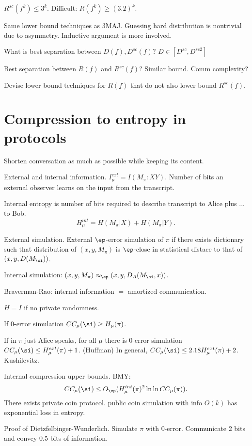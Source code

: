 $R^{sc}(f^k)\le 3^k$. Difficult: $R(f^k)\ge (3.2)^k$.

Same lower bound techniques as 3MAJ. Guessing hard distribution is nontrivial due to asymmetry. Inductive argument is more involved.

What is best separation between $D(f),D^{sc}(f)$? $D\in [D^{sc},D^{sc2}]$

Best separation between $R(f)$ and $R^{sc}(f)$? Similar bound. Comm complexity?

Devise lower bound techniques for $R(f)$ that do not also lower bound $R^{sc}(f)$.

\section{Compression to entropy in protocols}

Shorten conversation as much as possible while keeping its content.

External and internal information. $I_\mu^{ext}=I(M_\pi:XY)$. Number of bits an external observer learns on the input from the transcript.

Internal entropy is number of bits required to describe transcript to Alice plus ... to Bob.
\[
H_\mu^{int}=H(M_\pi|X)+H(M_\pi|Y).
\]

External simulation. External $\ep$-error simulation of $\pi$ if there exists dictionary such that distribution of $(x,y,M_\pi)$ is $\ep$-close in statistical distace to that of $(x,y,D(M_\si))$.

Internal simulation: $(x,y,M_\pi)\approx_\ep (x,y,D_{A}(M_\si,x))$.

Braverman-Rao: internal information $=$ amortized communication.

$H=I$ if no private randomness.

If 0-error simulation $CC_\mu(\si)\ge H_\mu(\pi)$.

If in $\pi$ just Alice speaks, for all $\mu$ there is 0-error simulation $CC_\mu(\si)\le H_\mu^{ext}(\pi)+1$. (Huffman)
In general, $CC_\mu(\si)\le 2.18H_\mu^{ext}(\pi)+2$. Kushilevitz.

Internal compression upper bounds. BMY:
\[
CC_\mu(\si)\le O_\ep(H_\mu^{int}(\pi)^2\ln \ln CC_\mu(\pi)).
\]
There exists private coin protocol. 
public coin simulation with info $O(k)$ has exponential loss in entropy.

Proof of Dietzfelbinger-Wunderlich.
Simulate $\pi$ with 0-error. Communicate 2 bits and convey 0.5 bits of information.


